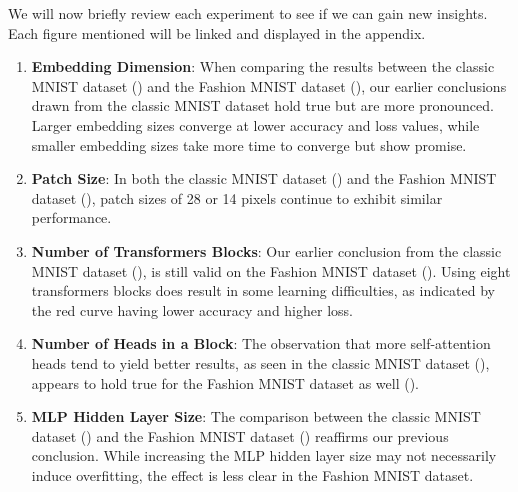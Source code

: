 We will now briefly review each experiment to see if we can gain new insights. Each figure mentioned will be linked and displayed in the appendix.
\begin{enumerate}
    \item \textbf{Embedding Dimension}: When comparing the results between the classic MNIST dataset () and the Fashion MNIST dataset (), our earlier conclusions drawn from the classic MNIST dataset hold true but are more pronounced. Larger embedding sizes converge at lower accuracy and loss values, while smaller embedding sizes take more time to converge but show promise.

    \item \textbf{Patch Size}: In both the classic MNIST dataset () and the Fashion MNIST dataset (), patch sizes of 28 or 14 pixels continue to exhibit similar performance.

    \item \textbf{Number of Transformers Blocks}: Our earlier conclusion from the classic MNIST dataset (), is still valid on the Fashion MNIST dataset (). Using eight transformers blocks does result in some learning difficulties, as indicated by the red curve having lower accuracy and higher loss.

    \item \textbf{Number of Heads in a Block}: The observation that more self-attention heads tend to yield better results, as seen in the classic MNIST dataset (), appears to hold true for the Fashion MNIST dataset as well ().

    \item \textbf{MLP Hidden Layer Size}: The comparison between the classic MNIST dataset () and the Fashion MNIST dataset () reaffirms our previous conclusion. While increasing the MLP hidden layer size may not necessarily induce overfitting, the effect is less clear in the Fashion MNIST dataset.
\end{enumerate}
